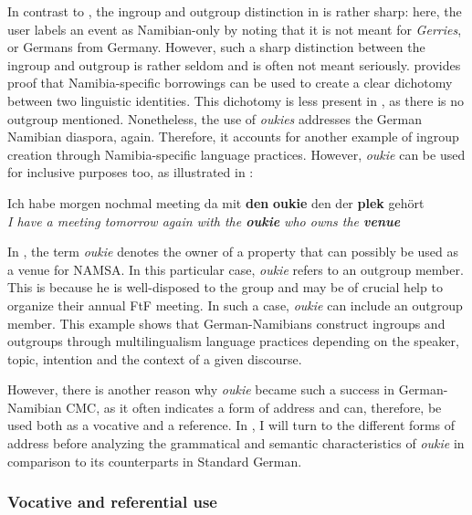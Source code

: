 \documentclass[output=paper]{langsci/langscibook}
\begin{document}
In contrast to , the ingroup and outgroup distinction in  is rather sharp: here, the user labels an event as Namibian-only by noting that it is not meant for \textit{Gerries}, or Germans from Germany. However, such a sharp distinction between the ingroup and outgroup is rather seldom and is often not meant seriously.  provides proof that Namibia-specific borrowings can be used to create a clear dichotomy between two linguistic identities. This dichotomy is less present in , as there is no outgroup mentioned. Nonetheless, the use of \textit{oukies} addresses the German Namibian diaspora, again. Therefore, it accounts for another example of ingroup creation through Namibia-specific language practices. However, \textit{oukie} can be used for inclusive purposes too, as illustrated in :

\ea\label{ex:radke:14}
 Ich habe morgen nochmal meeting da mit \textbf{den} \textbf{oukie} den der \textbf{plek} gehört\\
\textit{I have a meeting tomorrow again with the \textbf{oukie} who owns the \textbf{venue}}\\
\z

In , the term \textit{oukie} denotes the owner of a property that can possibly be used as a venue for NAMSA. In this particular case, \textit{oukie} refers to an outgroup member. This is because he is well-disposed to the group and may be of crucial help to organize their annual FtF meeting. In such a case, \textit{oukie} can include an outgroup member. This example shows that German-Namibians construct ingroups and outgroups through multilingualism language practices depending on the speaker, topic, intention and the context of a given discourse. 

However, there is another reason why \textit{oukie} became such a success in German-Namibian CMC, as it often indicates a form of address and can, therefore, be used both as a vocative and a reference. In , I will turn to the different forms of address before analyzing the grammatical and semantic characteristics of \textit{oukie} in comparison to its counterparts in Standard German.

 
\subsubsection{Vocative and referential use} 
 \label{sec:radke:3.4.3}
\end{document}
